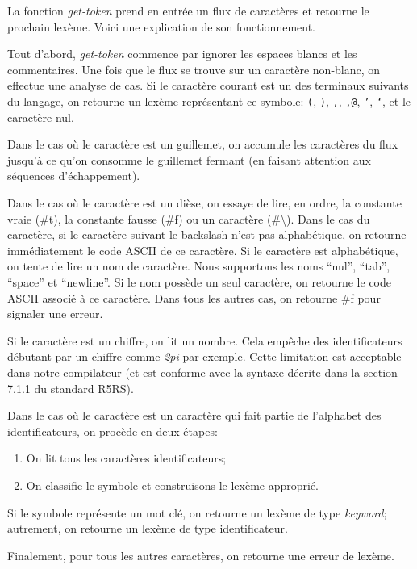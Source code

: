 \documentclass[11pt]{report}
\begin{document}
La fonction \emph{get-token} prend en entrée un flux de caractères et
retourne le prochain lexème.  Voici une explication de son
fonctionnement.

Tout d'abord, \emph{get-token} commence par ignorer les espaces blancs
et les commentaires.  Une fois que le flux se trouve sur un caractère
non-blanc, on effectue une analyse de cas.  Si le caractère courant
est un des terminaux suivants du langage, on retourne un lexème
représentant ce symbole: \texttt{(}, \texttt{)}, \texttt{,},
\texttt{,@}, \texttt{'}, \texttt{`}, et le caractère nul.

Dans le cas où le caractère est un guillemet, on accumule les
caractères du flux jusqu'à ce qu'on consomme le guillemet fermant (en
faisant attention aux séquences d'échappement).

Dans le cas où le caractère est un dièse, on essaye de lire, en ordre,
la constante vraie (\#t), la constante fausse (\#f) ou un caractère
(\#\textbackslash).  Dans le cas du caractère, si le caractère suivant
le backslash n'est pas alphabétique, on retourne immédiatement le code
ASCII de ce caractère.  Si le caractère est alphabétique, on tente de
lire un nom de caractère.  Nous supportons les noms ``nul'', ``tab'',
``space'' et ``newline''.  Si le nom possède un seul caractère, on
retourne le code ASCII associé à ce caractère.  Dans tous les autres
cas, on retourne \#f pour signaler une erreur.

Si le caractère est un chiffre, on lit un nombre.  Cela empêche des
identificateurs débutant par un chiffre comme \emph{2pi} par exemple.
Cette limitation est acceptable dans notre compilateur (et est
conforme avec la syntaxe décrite dans la section 7.1.1 du standard
R5RS).

Dans le cas où le caractère est un caractère qui fait partie de
l'alphabet des identificateurs, on procède en deux étapes:

\begin{enumerate}
\item On lit tous les caractères identificateurs;
\item On classifie le symbole et construisons le lexème approprié.
\end{enumerate}

Si le symbole représente un mot clé, on retourne un lexème de type
\emph{keyword}; autrement, on retourne un lexème de type
identificateur.

Finalement, pour tous les autres caractères, on retourne une erreur de
lexème.
\end{document}
